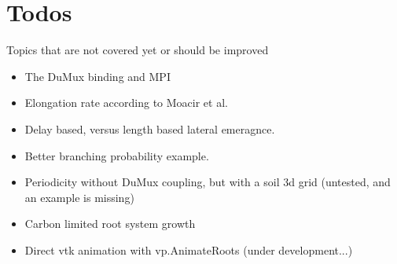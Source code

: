 
\newpage
\section{Todos}
Topics that are not covered yet or should be improved

\begin{itemize}

\item The DuMux binding and MPI

\item Elongation rate according to Moacir et al.

\item Delay based, versus length based lateral emeragnce.

\item Better branching probability example.

\item Periodicity without DuMux coupling, but with a soil 3d grid (untested, and an example is missing)

\item Carbon limited root system growth

\item Direct vtk animation with vp.AnimateRoots (under development...)

\end{itemize}

